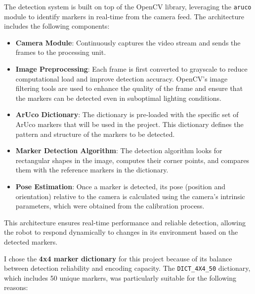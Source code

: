 The detection system is built on top of the OpenCV library, leveraging the \texttt{aruco} module to identify markers in real-time from the camera feed. The architecture includes the following components:

\begin{itemize}
	\item \textbf{Camera Module}: Continuously captures the video stream and sends the frames to the processing unit.
	\item \textbf{Image Preprocessing}: Each frame is first converted to grayscale to reduce computational load and improve detection accuracy. OpenCV’s image filtering tools are used to enhance the quality of the frame and ensure that the markers can be detected even in suboptimal lighting conditions.
	\item \textbf{ArUco Dictionary}: The dictionary is pre-loaded with the specific set of ArUco markers that will be used in the project. This dictionary defines the pattern and structure of the markers to be detected.
	\item \textbf{Marker Detection Algorithm}: The detection algorithm looks for rectangular shapes in the image, computes their corner points, and compares them with the reference markers in the dictionary.
	\item \textbf{Pose Estimation}: Once a marker is detected, its pose (position and orientation) relative to the camera is calculated using the camera's intrinsic parameters, which were obtained from the calibration process.
\end{itemize}

This architecture ensures real-time performance and reliable detection, allowing the robot to respond dynamically to changes in its environment based on the detected markers.


I chose the \textbf{4x4 marker dictionary} for this project because of its balance between detection reliability and encoding capacity. The \texttt{DICT\_4X4\_50} dictionary, which includes 50 unique markers, was particularly suitable for the following reasons:

